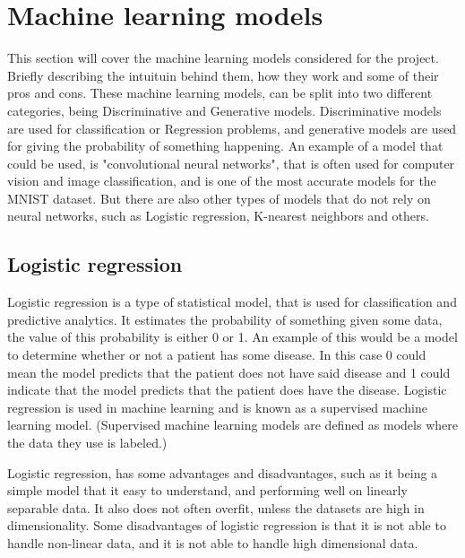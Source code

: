 \section{Machine learning models}\label{sec:machine-learning-models}
This section will cover the machine learning models considered for the project. Briefly describing the intuituin behind them, how they work and some of their pros and cons. These machine learning models, can be split into two different categories, being Discriminative and Generative models. Discriminative models are used for classification or Regression problems, and generative models are used for giving the probability of something happening. An example of a model that could be used, is "convolutional neural networks", that is often used for computer vision and image classification, and is one of the most accurate models for the MNIST dataset\cite{MnistStatictics}. But there are also other types of models that do not rely on neural networks, such as Logistic regression, K-nearest neighbors and others.

\subsection{Logistic regression}
Logistic regression is a type of statistical model, that is used for classification and predictive analytics. It estimates the probability of something given some data, the value of this probability is either 0 or 1. An example of this would be a model to determine whether or not a patient has some disease. In this case 0 could mean the model predicts that the patient does not have said disease and 1 could indicate that the model predicts that the patient does have the disease. Logistic regression is used in machine learning and is known as a supervised machine learning model.\cite{WhatIsLogisticRegression} (Supervised machine learning models are defined as models where the data they use is labeled\cite{SupervisedLearning}.)

Logistic regression, has some advantages and disadvantages, such as it being a simple model that it easy to understand, and performing well on linearly separable data. It also does not often overfit, unless the datasets are high in dimensionality. Some disadvantages of logistic regression is that it is not able to handle non-linear data, and it is not able to handle high dimensional data. \cite{LogisticRegressionProsAndCons}


